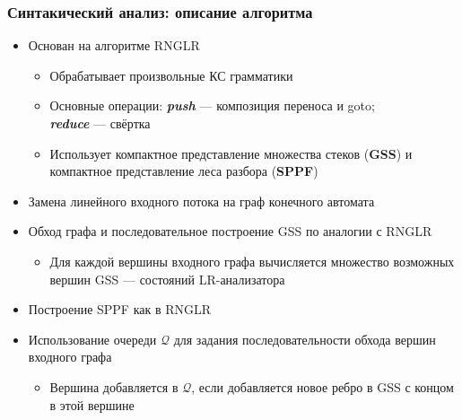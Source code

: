 \documentclass{beamer}
\begin{document}
\begin{frame}
    \transwipe[direction=90]
    \frametitle{Синтакический анализ: описание алгоритма}
    \begin{itemize}         
        \item Основан на алгоритме RNGLR
        \begin{itemize}         
           \item Обрабатывает произвольные КС грамматики
           \item Основные операции: {\bfseries{\textit{push}}} --- композиция переноса и goto; \\ 
           {\color{white}{Основные операции:}}                          
           {\bfseries{\textit{reduce}}} --- свёртка
           \item Использует компактное представление множества стеков ({\bfseries GSS}) и компактное представление леса разбора ({\bfseries SPPF})
        \end{itemize}
        \item Замена линейного входного потока на граф конечного автомата
        \item Обход графа и последовательное построение GSS по аналогии с RNGLR
            \begin{itemize}         
                \item Для каждой вершины входного графа вычисляется множество возможных вершин GSS --- состояний LR-анализатора
            \end{itemize}
        \item Построение SPPF как в RNGLR
        \item Использование очереди $\mathcal Q$ для задания последовательности обхода вершин 
        входного графа
            \begin{itemize}         
                \item Вершина добавляется в $\mathcal Q$, если добавляется новое ребро в GSS с концом в этой вершине
            \end{itemize}
    \end{itemize}
\end{frame}
\end{document}
